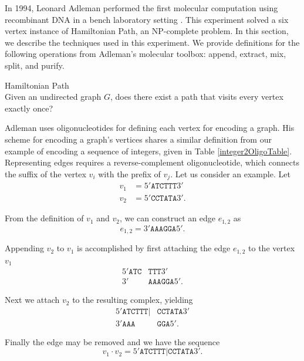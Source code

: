 In 1994, Leonard Adleman performed the first molecular computation using recombinant DNA in a bench laboratory setting \cite{Adleman:1994:MCS:189441.189442}.  This experiment solved a six vertex instance of {\sc Hamiltonian Path}, an \textsf{NP-complete} problem.  In this section, we describe the techniques used in this experiment. We provide definitions for the following operations from Adleman's molecular toolbox: append, extract, mix, split, and purify.

\begin{definition}
{\sc Hamiltonian Path} \\
Given an undirected graph $G$, does there exist a path that visits every vertex exactly once?
\end{definition}

Adleman uses oligonucleotides for defining each vertex for encoding a graph.  His scheme for encoding a graph's vertices shares a similar definition from our example of encoding a sequence of integers, given in Table \ref{integer2OligoTable}.  Representing edges requires a reverse-complement oligonucleotide, which connects the suffix of the vertex $v_i$ with the prefix of $v_j$.  Let us consider an example.  Let
\begin{align*}
 v_1 &= 5'\texttt{ATCTTT}3' \\
 v_2 &= 5'\texttt{CCTATA}3'.
\end{align*}

\noindent From the definition of $v_1$ and $v_2$, we can construct an edge $e_{1,2}$ as
\[
e_{1,2} = 3'\texttt{AAAGGA}5'.
\]

\noindent Appending $v_2$ to $v_1$ is accomplished by first attaching the edge $e_{1,2}$ to the vertex $v_1$
\begin{align*}
 5'\texttt{ATC}&\texttt{TTT}3' \\
  3'&\texttt{AAAGGA}5'.
\end{align*}

\noindent Next we attach $v_2$ to the resulting complex, yielding
\begin{align*}
 5'\texttt{ATCTTT}|&\texttt{CCTATA}3'\\
  3'\texttt{AAA}&\texttt{GGA}5'.
\end{align*}

\noindent Finally the edge may be removed and we have the sequence
\[
v_1 \cdot v_2 = 5'\texttt{ATCTTT}|\texttt{CCTATA}3'.
\]

